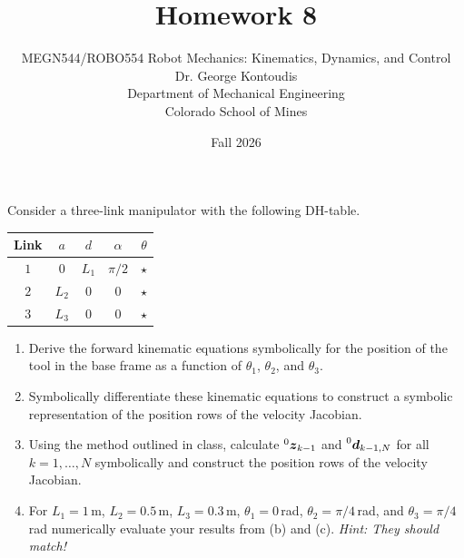 \documentclass[12pt]{article}
\newenvironment{problem}[2][Problem]{\begin{trivlist}
\item[\hskip \labelsep {\bfseries #1}\hskip \labelsep {\bfseries #2.}]}{\end{trivlist}}
\begin{document}
 
 
\title{Homework 8}
\author{MEGN544/ROBO554 Robot Mechanics: Kinematics, Dynamics, and Control  
\\ 
Dr. George Kontoudis\\
Department of Mechanical Engineering\\
Colorado School of Mines}
\date{Fall 2026}
 
\maketitle

\begin{problem}{1}%
Consider a three-link manipulator with the following DH-table.
\begin{table}[!h]
\centering
\begin{tabular}{c | c | c | c | c}
\hline 
 {Link} & $a$   & $d$  & $\alpha$ & $\theta$\\  \hline
 $1$    & $0$   & $L_1$  & $\pi/2$  & $\star$ \\ 
 $2$    & $L_2$ & $0$  & $0$      & $\star$ \\ 
 $3$    & $L_3$ & $0$  & $0$      & $\star$ \\  \hline
\end{tabular}\label{tab:part_1_ii}
\end{table}

\begin{enumerate}[label=(\alph*)]
    \item Derive the forward kinematic equations symbolically for the position of the tool in the base frame as a function of $\theta_1$, $\theta_2$, and $\theta_3$.
    \item Symbolically differentiate these kinematic equations to construct a symbolic representation of the position rows of the velocity Jacobian.
    \item Using the method outlined in class, calculate $\prescript{0}{}{\boldsymbol{z}}_{k-1}$ and $\prescript{0}{}{\boldsymbol{d}}_{k-1,N}$ for all $k=1,\hdots,N$ symbolically and construct the position rows of the velocity Jacobian.
    \item For $L_1 = 1$\,m, $L_2 = 0.5$\,m, $L_3 = 0.3$\,m, $\theta_1 = 0$\,rad, $\theta_2 = \pi/4$\,rad, and $\theta_3 = \pi/4$\,rad numerically evaluate your results from (b) and (c). \textit{Hint: They should match!}
\end{enumerate}


\end{problem}
\end{document}
